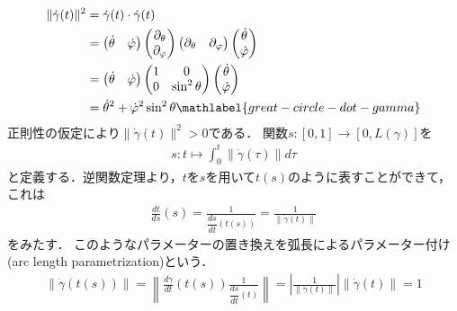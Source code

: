 \documentclass{ltjsbook}
\begin{document}
\begin{align}
    \lVert \dot{\gamma}(t) \rVert^2
    &= \dot{\gamma}(t) \cdot \dot{\gamma}(t) \notag \\
    &= \begin{pmatrix}
            \dot{\theta} & \dot{\varphi}
        \end{pmatrix}
        \begin{pmatrix}
            \partial_\theta \\ \partial_\varphi
        \end{pmatrix}
        \begin{pmatrix}
            \partial_\theta & \partial_\varphi
        \end{pmatrix}
        \begin{pmatrix}
            \dot{\theta} \\ \dot{\varphi}
        \end{pmatrix} \notag \\
    &= \begin{pmatrix}
            \dot{\theta} & \dot{\varphi}
        \end{pmatrix}
        \begin{pmatrix}
            1 & 0 \\
            0 & \sin^2 \theta \\
        \end{pmatrix}
        \begin{pmatrix}
            \dot{\theta} \\ \dot{\varphi}
        \end{pmatrix} \notag \\
    &=  \dot{\theta}^2 + \dot{\varphi}^2 \sin^2 \theta \mathlabel{great-circle-dot-gamma}
\end{align}
正則性の仮定により\(\lVert \dot{\gamma}(t) \rVert^2 > 0\)である．
関数\(s \colon [0, 1] \to [0, L(\gamma)]\)を
\begin{align*}
    s \colon t \mapsto \int_0^t \lVert \dot{\gamma}(\tau) \rVert d\tau
\end{align*}
と定義する．逆関数定理より，\(t\)を\(s\)を用いて\(t(s)\)のように表すことができて，これは
\begin{align*}
    \frac{dt}{ds}(s)
    = \frac{1}{\dfrac{ds}{dt}(t(s))}
    = \frac{1}{\lVert \dot{\gamma}(t) \rVert}
\end{align*}
をみたす．
このようなパラメーターの置き換えを弧長によるパラメーター付け(arc length parametrization)という．
\begin{align}
    \lVert \dot{\gamma}(t(s)) \rVert
    = \left\lVert \frac{d\gamma}{dt}(t(s)) \frac{1}{\dfrac{ds}{dt}(t)} \right\rVert
    = \left\lvert \frac{1}{\lVert \dot{\gamma}(t) \rVert} \right\rvert \lVert \dot{\gamma}(t) \rVert
    = 1
\end{align}
\end{document}
